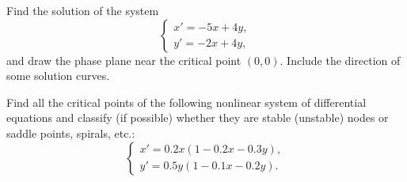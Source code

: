 \documentclass[11pt,oneside]{article}
\begin{document}
\begin{problem}
Find the solution of the system
\[
\begin{cases}
x'=-5x+4y,\\
y'=-2x+4y,
\end{cases}
\]
and draw the phase plane near the critical point $(0,0)$. Include the direction of some solution curves.
\end{problem}

\begin{problem}
Find all the critical points of the following nonlinear system of differential equations and classify (if possible) whether they are stable (unstable) nodes or saddle points, spirals, etc.:
\[
\begin{cases}
x'=0.2x(1-0.2x-0.3y),\\
y'=0.5y(1-0.1x-0.2y).
\end{cases}
\]
\end{problem}
\end{document}
